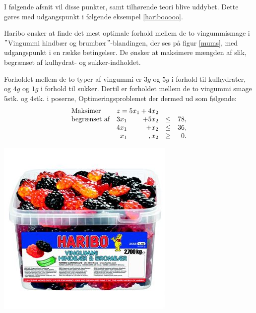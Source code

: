 \noindent
%
I følgende afsnit vil disse punkter, samt tilhørende teori blive uddybet. 
Dette gøres med udgangspunkt i følgende eksempel \ref{haribooooo}.
%
\\
%
\begin{eks}
\label{haribooooo}
Haribo ønsker at finde det mest optimale forhold mellem de to vingummismage i $"$Vingummi hindbær og brumbær$"$-blandingen, der ses på figur \ref{mums}, med udgangspunkt i en række betingelser. 
De ønsker at maksimere mængden af slik, begrænset af kulhydrat- og sukker-indholdet.
\\
%
\begin{minipage}[b]{0.55\textwidth}
%
Forholdet mellem de to typer af vingummi er $3 g$ og $5 g$ i forhold til kulhydrater, og $4 g$ og $1 g$ i forhold til sukker. 
Dertil er forholdet mellem de to vingummi smage $5$stk. og $4$stk. i poserne, 
Optimeringsproblemet der dermed ud som følgende:
%
\begin{align*}
\begin{array}{lrrlr}
\text{Maksimer}		&	\multicolumn{2}{c}{z=5x_1+4x_2}  &\\
\text{begrænset af}	&3x_1& +5x_2			&\leq 	&78,\\
					&4x_1& + x_2				&\leq	& 36,\\
					&x_1& , x_2				&\geq	& 0.
\end{array}
\end{align*}
%
\end{minipage}
%
\begin{minipage}[b]{0.4\textwidth}
%
\center
\includegraphics[scale=0.7]{fig/img/hindbaerbrombaer}
%
\label{mums}
\end{minipage}
%
\end{eks}


